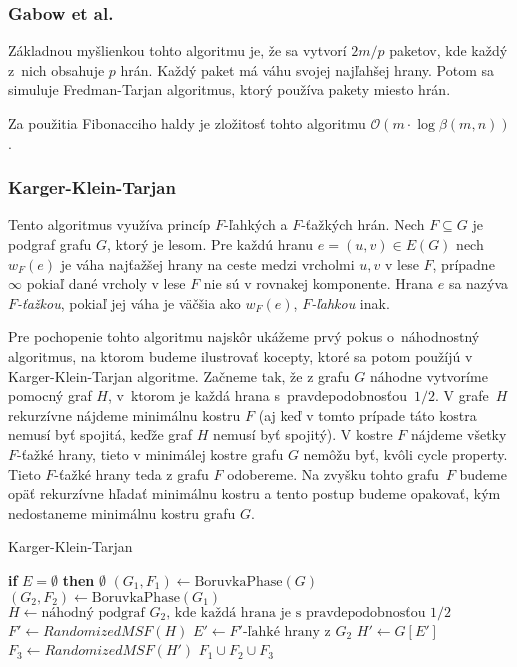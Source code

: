 \subsubsection{Gabow et al.}

Základnou myšlienkou tohto algoritmu je, že sa vytvorí $2m/p$ paketov,
kde každý z~nich obsahuje $p$ hrán. Každý paket má váhu svojej najľahšej
hrany. Potom sa simuluje Fredman-Tarjan algoritmus, ktorý používa pakety
miesto hrán.

Za použitia Fibonacciho haldy je zložitosť tohto algoritmu 
$\mathcal{O}(m \cdot \log\beta(m,n))$.

\subsubsection{Karger-Klein-Tarjan}

Tento algoritmus využíva princíp $F$-ľahkých a $F$-ťažkých hrán.
Nech $F\subseteq G$ je podgraf grafu $G$, ktorý je lesom. Pre
každú hranu $e=(u,v) \in E(G)$ nech $w_F(e)$ je váha najťažšej hrany
na ceste medzi vrcholmi $u,v$ v lese $F$, prípadne $\infty$ pokiaľ
dané vrcholy v lese $F$ nie sú v rovnakej komponente. Hrana $e$
sa nazýva {\em $F$-ťažkou}, pokiaľ jej váha je väčšia ako $w_F(e)$, 
{\em $F$-ľahkou} inak.

Pre pochopenie tohto algoritmu najskôr ukážeme prvý pokus o~náhodnostný
algoritmus, na ktorom budeme ilustrovať kocepty, ktoré sa potom 
použíjú v Karger-Klein-Tarjan algoritme. Začneme tak, že z grafu $G$ náhodne
vytvoríme pomocný graf $H$, v~ktorom je každá hrana s~pravdepodobnosťou~$1/2$. 
V grafe~$H$ rekurzívne nájdeme minimálnu kostru $F$ (aj keď v tomto prípade
táto kostra nemusí byť spojitá, keďže graf $H$ nemusí byť spojitý).
V kostre $F$ nájdeme všetky $F$-ťažké hrany, tieto v minimálej 
kostre grafu $G$ nemôžu byť, kvôli cycle property. Tieto $F$-ťažké
hrany teda z grafu $F$ odobereme. Na zvyšku tohto grafu~$F$ budeme
opäť rekurzívne hľadať minimálnu kostru a tento postup budeme opakovať, kým
nedostaneme minimálnu kostru grafu $G$.

\begin{algorithm}
\caption{Karger-Klein-Tarjan}
\begin{algorithmic}[1]
    \State \textbf{if} {$E = \emptyset$} \textbf{then} \Return $\emptyset$
    \State $(G_1, F_1) \gets \text{BoruvkaPhase}(G)$
	\State $(G_2, F_2) \gets \text{BoruvkaPhase}(G_1)$
	\State $H \gets \text{náhodný podgraf }G_2\text{, kde každá hrana je s pravdepodobnosťou }1/2$
	\State $F' \gets RandomizedMSF(H)$
	\State $E' \gets F'\text{-ľahké hrany z }G_2$
	\State $H' \gets G[E']$
	\State $F_3 \gets RandomizedMSF(H')$
    \State \Return $F_1 \cup F_2 \cup F_3$
\EndFunction
\end{algorithmic}
\end{algorithm}


